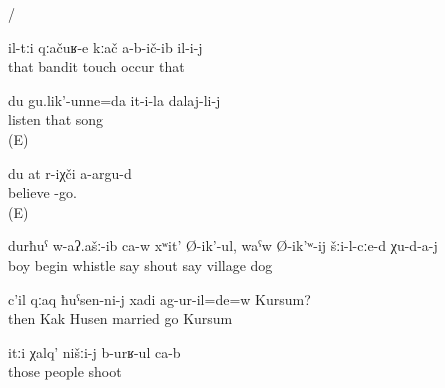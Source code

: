 \begin{exe}
	\ex	\label{ex:extended intransitive verbs}
	\begin{xlist}
		\ex	{} 
		\ex	{} 
		\ex	{} 
		\ex	{} 
		\ex	{} 
		\ex	{} 
		\ex	{} 
		\ex	{}\slash{} 
		\ex	{} 
		\ex	{} 
		\ex	{} 
		\ex	{} 
	\end{xlist}

	\ex	\label{ex:The bandits did not touch him}
	\gll	il-tːi	qːačuʁ-e	kːač	a-b-ič-ib	il-i-j\\
		that	bandit	touch	occur	that\\
	\glt	{}

	\ex	\label{ex:I am listening to her/his song}
	\gll	du 	gu.lik'-unne=da 	it-i-la 	dalaj-li-j\\
			listen	that	song\\
	\glt	{} (E)

	\ex	\label{ex:I (fem.) do not believe (in) you@30a}
	\gll	du	at	r-iχči a-argu-d\\
				believe -go.\\
	\glt	{} (E)

	\ex	\label{ex:The boy began to whistle and to cry to the dogs in the village}
	\gll	durħuˁ	w-aʔ.ašː-ib ca-w	xʷit'	Ø-ik'-ul,	waˁw	Ø-ik'ʷ-ij	šːi-l-cːe-d	χu-d-a-j\\
		boy	begin 	whistle	say	shout	say	village	dog\\
	\glt	{}

	\ex	\label{ex:Then did Kursum (fem.) marry Husen (masc.)}
	\gll	c'il	qːaq	ħuˁsen-ni-j	xadi	ag-ur-il=de=w	Kursum?\\
		then	Kak	Husen	married	go	Kursum\\
	\glt	{}

	\ex	\label{ex:‎‎‎The people fought us}
	\gll	itːi	χalq'	nišːi-j	b-urʁ-ul	ca-b\\
		those	people		shoot	\\
	\glt	{}
\end{exe}

